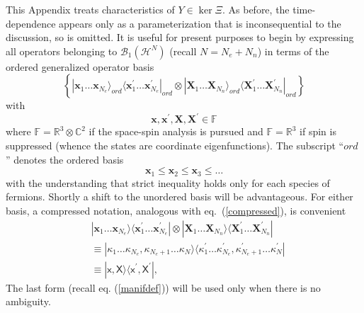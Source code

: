 \documentclass[aps,preprint]{revtex4}%
\begin{document}
\noindent This Appendix treats characteristics of $Y\in\ker\Xi$. As before,
the time-dependence appears only as a parameterization that is inconsequential
to the discussion, so is omitted. It is useful for present purposes to begin
by expressing all operators belonging to $\mathcal{B}_{1}(\mathcal{H}^{N})$
(recall $N=N_{e}+N_{n}$) in terms of the ordered generalized operator basis
\cite{BerezinShubin}
\begin{equation}
\left\{  |\mathbf{x}_{1}\ldots\mathbf{x}_{N_{e}}\rangle_{ord}\langle
\mathbf{x}_{1}^{\prime}\ldots\mathbf{x}_{N_{e}}^{\prime}|_{ord}\otimes
|\mathbf{X}_{1}\ldots\mathbf{X}_{N_{n}}\rangle_{ord}\langle\mathbf{X}%
_{1}^{\prime}\ldots\mathbf{X}_{N_{n}}^{\prime}|_{ord}\right\}
\end{equation}
with
\begin{equation}
\mathbf{x},\mathbf{x}^{\prime},\mathbf{X},\mathbf{X}^{\prime}\in\mathbb{F}%
\end{equation}
where $\mathbb{F}=\mathbb{R}^{3}\otimes\mathbb{C}^{2}$ if the space-spin
analysis is pursued and $\mathbb{F}=\mathbb{R}^{3}$ if spin is suppressed
(whence the states are coordinate eigenfunctions). The subscript ``$ord$''
denotes the ordered basis
\begin{equation}
\mathbf{x}_{1}\leq\mathbf{x}_{2}\leq\mathbf{x}_{3}\leq\ldots
\end{equation}
with the understanding that strict inequality holds only for each species of
fermions. Shortly a shift to the unordered basis will be advantageous. For
either basis, a compressed notation, analogous with eq.~(\ref{compressed}), is
convenient
\begin{align}
&  |\mathbf{x}_{1}\ldots\mathbf{x}_{N_{e}}\rangle\langle\mathbf{x}_{1}%
^{\prime}\ldots\mathbf{x}_{N_{e}}^{\prime}|\otimes|\mathbf{X}_{1}%
\ldots\mathbf{X}_{N_{n}}\rangle\langle\mathbf{X}_{1}^{\prime}\ldots
\mathbf{X}_{N_{n}}^{\prime}|\nonumber\\
&  \equiv|\kappa_{1}\ldots\kappa_{N_{e}},\kappa_{N_{e}+1}\ldots\kappa
_{N}\rangle\langle\kappa_{1}^{\prime}\ldots\kappa_{N_{e}}^{\prime}%
,\kappa_{N_{e}+1}^{\prime}\ldots\kappa_{N}^{\prime}|\nonumber\\
&  \equiv|\mathsf{x},\mathsf{X}\rangle\langle\mathsf{x}^{\prime}%
,\mathsf{X}^{\prime}|,
\end{align}
The last form (recall eq. (\ref{manifdef})) will be used only when there is no ambiguity.
\end{document}
